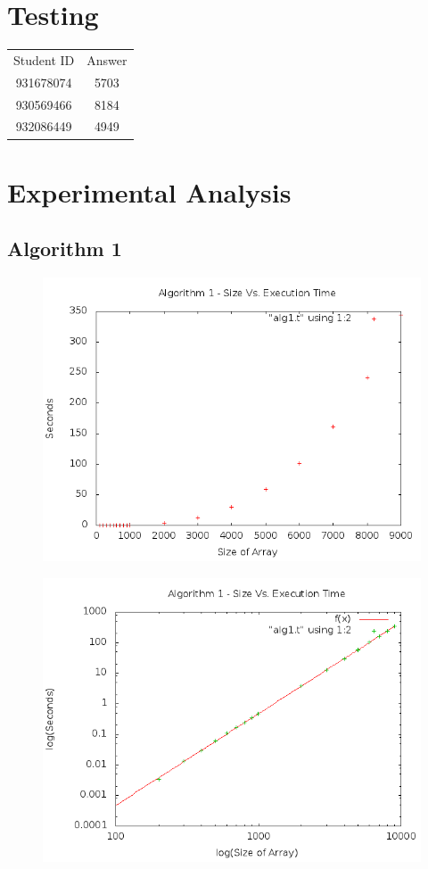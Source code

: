 \documentclass[a4paper,10pt]{article}
\begin{document}
	\section{Testing}

\begin{tabular}{ | c | c | }
  \hline
  Student ID & Answer\\
  931678074 & 5703 \\
  930569466 & 8184 \\
  932086449 & 4949 \\
  \hline  
\end{tabular}
\newpage
	\section{Experimental Analysis}
		\subsection{Algorithm 1}
		
			\begin{figure}[!htb]
				\centering
				\includegraphics[scale=.5]{timingfiles/alg1plot.png}
			\end{figure}
			\begin{figure}[!htb]
				\centering
				\includegraphics[scale=.5]{timingfiles/alg1plotlog.png}
			\end{figure}
		\newpage
\end{document}
